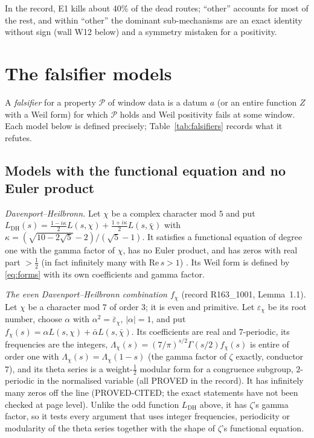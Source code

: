 \documentclass[11pt]{amsart}
\theoremstyle{definition}
\theoremstyle{remark}
\newcommand{\Rel}{\mathrm{Re}\,}
\begin{document}
In the record, E1 kills about 40\% of the dead routes; ``other'' accounts for most of the rest, and
within ``other'' the dominant sub-mechanisms are an exact identity without sign (wall W12 below) and
a symmetry mistaken for a positivity.

\section{The falsifier models}\label{sec:falsifiers}

A \emph{falsifier} for a property $\mathscr P$ of window data is a datum $a$ (or an entire function
$Z$ with a Weil form) for which $\mathscr P$ holds and Weil positivity fails at some window. Each model
below is defined precisely; Table~\ref{tab:falsifiers} records what it refutes.

\subsection{Models with the functional equation and no Euler product}
\emph{Davenport--Heilbronn.} Let $\chi$ be a complex character mod $5$ and put
$L_{\mathrm{DH}}(s)=\frac{1-i\kappa}2L(s,\chi)+\frac{1+i\kappa}2L(s,\bar\chi)$ with
$\kappa=(\sqrt{10-2\sqrt5}-2)/(\sqrt5-1)$. It satisfies a functional equation of degree one with the
gamma factor of $\chi$, has no Euler product, and has zeros with real part $>\frac12$ (in fact
infinitely many with $\Rel s>1$) \cite{DavenportHeilbronn1936}. Its Weil form is defined by
\eqref{eq:forms} with its own coefficients and gamma factor.

\emph{The even Davenport--Heilbronn combination $f_\chi$} (record R163\_1001, Lemma~1.1). Let $\chi$ be a
character mod $7$ of order $3$; it is even and primitive. Let $\varepsilon_\chi$ be its root number, choose
$\alpha$ with $\alpha^2=\bar\varepsilon_\chi$, $|\alpha|=1$, and put $f_\chi(s)=\alpha L(s,\chi)+\bar\alpha L(s,\bar\chi)$.
Its coefficients are real and $7$-periodic, its frequencies are the integers, $\Lambda_\chi(s)=(7/\pi)^{s/2}\Gamma(s/2)f_\chi(s)$
is entire of order one with $\Lambda_\chi(s)=\Lambda_\chi(1-s)$ (the gamma factor of $\zeta$ exactly, conductor $7$),
and its theta series is a weight-$\frac12$ modular form for a congruence subgroup, $2$-periodic in the normalised
variable (all PROVED in the record). It has infinitely many zeros off the line \cite{KaczorowskiKulas2007,SaiasWeingartner2009}
(PROVED-CITED; the exact statements have not been checked at page level).
Unlike the odd function $L_{\mathrm{DH}}$ above, it has $\zeta$'s gamma factor, so it tests every argument that uses integer
frequencies, periodicity or modularity of the theta series together with the shape of $\zeta$'s functional equation.
\end{document}
